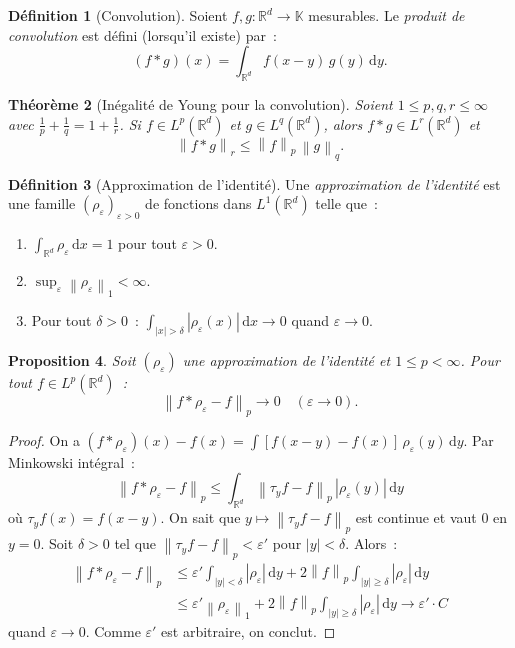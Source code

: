 \documentclass[a4paper,12pt]{book}
\newcommand{\R}{\mathbb{R}}
\newcommand{\K}{\mathbb{K}}
\newcommand{\dd}{\mathrm{d}}
\newcommand{\norm}[1]{\left\| #1 \right\|}
\newcommand{\abs}[1]{\left| #1 \right|}
\theoremstyle{definition}
\newtheorem{definition}{Définition}[chapter]
\theoremstyle{plain}
\newtheorem{theoreme}[definition]{Théorème}
\newtheorem{proposition}[definition]{Proposition}
\theoremstyle{remark}
\begin{document}
\begin{definition}[Convolution]
\label{def:convolution}
Soient $f, g : \R^d \to \K$ mesurables. Le \emph{produit de convolution} est défini (lorsqu'il existe) par~:
\[
  (f * g)(x) = \int_{\R^d} f(x - y)\, g(y)\, \dd y.
\]
\end{definition}

\begin{theoreme}[Inégalité de Young pour la convolution]
\label{thm:young-convolution}
Soient $1 \le p, q, r \le \infty$ avec $\frac{1}{p} + \frac{1}{q} = 1 + \frac{1}{r}$.
Si $f \in L^p(\R^d)$ et $g \in L^q(\R^d)$, alors $f * g \in L^r(\R^d)$ et
\[
  \norm{f * g}_r \le \norm{f}_p \, \norm{g}_q.
\]
\end{theoreme}

\begin{definition}[Approximation de l'identité]
\label{def:approx-identite}
Une \emph{approximation de l'identité} est une famille $(\rho_\varepsilon)_{\varepsilon > 0}$
de fonctions dans $L^1(\R^d)$ telle que~:
\begin{enumerate}[label=(\roman*)]
  \item $\int_{\R^d} \rho_\varepsilon\,\dd x = 1$ pour tout $\varepsilon > 0$.
  \item $\sup_\varepsilon \norm{\rho_\varepsilon}_1 < \infty$.
  \item Pour tout $\delta > 0$~:
        $\int_{\abs{x} > \delta} \abs{\rho_\varepsilon(x)}\,\dd x \to 0$ quand
        $\varepsilon \to 0$.
\end{enumerate}
\end{definition}

\begin{proposition}
\label{prop:approx-identite-conv}
Soit $(\rho_\varepsilon)$ une approximation de l'identité et $1 \le p < \infty$. Pour
tout $f \in L^p(\R^d)$~:
\[
  \norm{f * \rho_\varepsilon - f}_p \to 0 \quad (\varepsilon \to 0).
\]
\end{proposition}

\begin{proof}
On a $(f * \rho_\varepsilon)(x) - f(x) = \int [f(x-y) - f(x)]\,\rho_\varepsilon(y)\,\dd y$.
Par Minkowski intégral~:
\[
  \norm{f * \rho_\varepsilon - f}_p
    \le \int_{\R^d} \norm{\tau_y f - f}_p\, \abs{\rho_\varepsilon(y)}\,\dd y
\]
où $\tau_y f(x) = f(x-y)$. On sait que $y \mapsto \norm{\tau_y f - f}_p$ est continue et
vaut $0$ en $y = 0$. Soit $\delta > 0$ tel que $\norm{\tau_y f - f}_p < \varepsilon'$ pour
$\abs{y} < \delta$. Alors~:
\begin{align*}
  \norm{f*\rho_\varepsilon - f}_p
    &\le \varepsilon' \int_{\abs{y} < \delta} \abs{\rho_\varepsilon}\,\dd y
      + 2\norm{f}_p \int_{\abs{y} \ge \delta} \abs{\rho_\varepsilon}\,\dd y \\
    &\le \varepsilon' \norm{\rho_\varepsilon}_1
      + 2\norm{f}_p \int_{\abs{y} \ge \delta} \abs{\rho_\varepsilon}\,\dd y
    \to \varepsilon' \cdot C
\end{align*}
quand $\varepsilon \to 0$. Comme $\varepsilon'$ est arbitraire, on conclut.
\end{proof}
\end{document}
